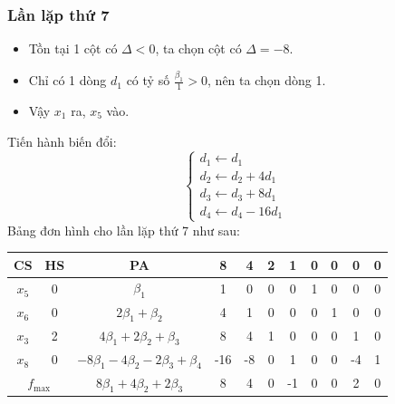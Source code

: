 \documentclass[12pt]{article}
\begin{document}
\subsubsection{Lần lặp thứ 7}
\begin{itemize}
\item Tồn tại 1 cột có $\Delta < 0$, ta chọn cột có $\Delta = -8$.
\item Chỉ có 1 dòng $d_1$ có tỷ số $\displaystyle \frac{\beta_1}{1} > 0$, nên ta chọn dòng 1.
\item Vậy $x_1$ ra, $x_5$ vào.
\end{itemize}
Tiến hành biến đổi:
$$
\left\{
\begin{array}{lll}
d_1 \leftarrow d_1 \\
d_2 \leftarrow d_2 + 4d_1 \\
d_3 \leftarrow d_3 + 8d_1\\
d_4 \leftarrow d_4 - 16d_1
\end{array}
\right.
$$
Bảng đơn hình cho lần lặp thứ 7 như sau:
\begin{table}[H]
\centering
\begin{tabular}{|c|c|c|c|c|c|c|c|c|c|c|}
\hline
CS & HS & PA & 8 & 4 & 2 & 1 & 0 & 0 & 0 & 0 \\
\hline
$x_5$ & 0 & $\beta_1$ & 1 & 0 & 0 & 0 & 1 & 0 & 0 & 0 \\
$x_6$ & 0 & $2\beta_1 + \beta_2$ & 4 & 1 & 0 & 0 & 0 & 1 & 0 & 0 \\
$x_3$ & 2 & $4\beta_1 + 2\beta_2 + \beta_3$ & 8 & 4 & 1 & 0 & 0 & 0 & 1 & 0 \\
$x_8$ & 0 & $-8\beta_1 - 4\beta_2 - 2\beta_3 + \beta_4$ & -16 & -8 & 0 & 1 & 0 & 0 & -4 & 1 \\
\hline
\multicolumn{2}{|c|}{$f_{\max}$}
& $8\beta_1 + 4\beta_2 + 2\beta_3$ & 8 & 4 & 0 & -1 & 0 & 0 & 2 & 0 \\
\hline
\end{tabular}
\end{table}
\end{document}
